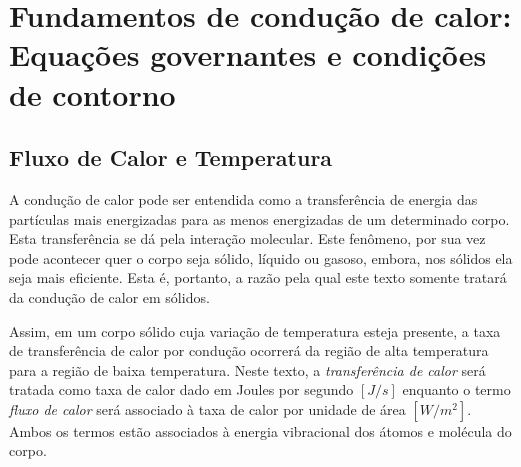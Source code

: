 \chapter[Fundamentos de condução de calor]{Fundamentos de condução de calor: Equações governantes e condições de contorno}

\section{Fluxo de Calor e Temperatura}

A condução de calor pode ser entendida como a transferência de energia das partículas mais energizadas para as menos energizadas de um determinado corpo. Esta transferência se dá pela interação molecular. Este fenômeno, por sua vez pode acontecer quer o corpo seja sólido, líquido ou gasoso, embora, nos sólidos ela seja mais eficiente. Esta é, portanto, a razão pela qual este texto somente tratará da condução de calor em sólidos.

Assim, em um corpo sólido cuja variação de temperatura esteja presente, a taxa de transferência de calor por condução ocorrerá da região de alta temperatura para a região de baixa temperatura.  Neste texto, a  \textit{transferência de calor} será tratada como taxa de calor dado em Joules por segundo $[J/s]$ enquanto o termo \textit{fluxo de calor} será associado à taxa de calor por unidade de área  $[W/m^2]$. Ambos os termos estão associados à energia vibracional dos átomos e molécula do corpo.

